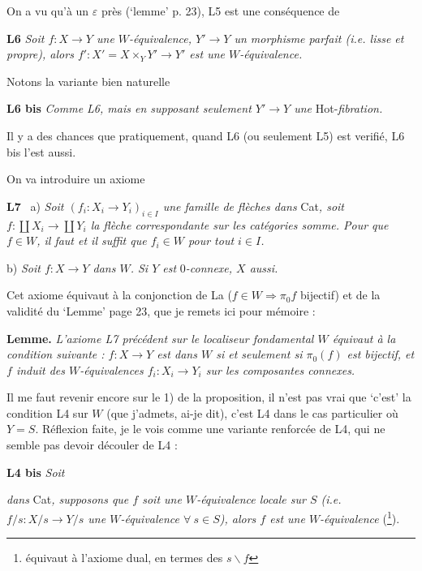 \documentclass[11pt]{article}
\newcommand{\printedpage}[1]{\marginpar{\footnotesize p.~#1}}
\newcommand{\msp}[1]{\marginpar{\footnotesize [#1]}}
\begin{document}
On a vu qu'à un $\varepsilon$ près (‘lemme’ p. 23), L5 est une conséquence de

\textbf{L6} \textit{Soit $f : X \longrightarrow Y$ une $W$-équivalence, $Y' \longrightarrow Y$ un morphisme parfait (i.e. lisse et propre), alors $f' : X' = X \times_Y Y' \longrightarrow Y'$ est une $W$-équivalence.}

\msp{page 44}
Notons la variante bien naturelle

\textbf{L6 bis} \textit{Comme L6, mais en supposant seulement $Y' \longrightarrow Y$ une} Hot-\textit{fibration.}

\printedpage{28}

Il y a des chances que pratiquement, quand L6 (ou seulement L5) est verifié, L6 bis l'est aussi. %

On va introduire un axiome

\textbf{L7} \ a) \textit{Soit $(f_i : X_i \longrightarrow Y_i)_{i \in I}$ une famille de flèches dans} Cat\textit{, soit $f : \coprod X_i \longrightarrow \coprod Y_i$ la flèche correspondante sur les catégories somme. Pour que $f \in W$, il faut et il suffit que $f_i \in W$ pour tout $i \in I$.}

\hspace*{2em}b) \textit{Soit $f : X \longrightarrow Y$ dans $W$. Si $Y$ est} $0$\textit{-connexe, $X$ aussi.}

Cet axiome équivaut à la conjonction de La ($f \in W \Longrightarrow \pi_0 f$ bijectif) et de la validité du ‘Lemme’ page 23, que je remets ici pour mémoire :

\textbf{Lemme.} \textit{L'axiome L7 précédent sur le localiseur fondamental $W$ équivaut à la condition suivante : $f : X \longrightarrow Y$ est dans $W$ si et seulement si $\pi_0(f)$ est bijectif, et $f$ induit des $W$-équivalences $f_i : X_i \longrightarrow Y_i$ sur les composantes connexes.}

Il me faut revenir encore sur le 1) de la proposition, il n'est pas vrai que ‘c'est’ la condition L4 sur $W$ (que j'admets, ai-je dit), c'est L4 dans le cas particulier où $Y = S$. Réflexion faite, je le vois comme une variante renforcée de L4, qui ne semble pas devoir découler de L4 :

\textbf{L4 bis} \textit{Soit}  \textit{dans} Cat\textit{, supposons que $f$ soit une $W$-équivalence locale sur $S$ (i.e. $f/s : X/s \longrightarrow Y/s$ une $W$-équivalence $\forall\ s \in S$), alors $f$ est une $W$-équivalence} (\footnote[29]{équivaut à l'axiome dual, en termes des $s\backslash f$}).
\end{document}
